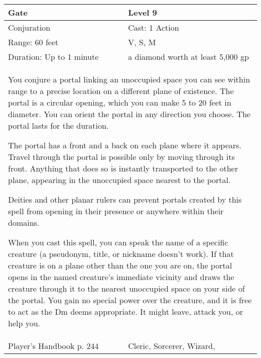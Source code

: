\documentclass[11pt]{report}
\begin{document}
\begin{table}[H]
	\begin{tabular}{||p{6cm}|p{6cm}||}
		\hline\hline
		\bf{Gate} & Level 9\\ \hline
		Conjuration & Cast: 1 Action\\ \hline
		Range: 60 feet & V, S, M\\ \hline
		Duration: Up to 1 minute & a diamond worth at least 5,000 gp\\ \hline
		\multicolumn{2}{||p{12cm}||}{You conjure a portal linking an unoccupied space you can see within range to a precise location on a different plane of existence. The portal is a circular opening, which you can make 5 to 20 feet in diameter. You can orient the portal in any direction you choose. The portal lasts for the duration.

The portal has a front and a back on each plane where it appears. Travel through the portal is possible only by moving through its front. Anything that does so is instantly transported to the other plane, appearing in the unoccupied space nearest to the portal.

Deities and other planar rulers can prevent portals created by this spell from opening in their presence or anywhere within their domains.

When you cast this spell, you can speak the name of a specific creature (a pseudonym, title, or nickname doesn’t work). If that creature is on a plane other than the one you are on, the portal opens in the named creature’s immediate vicinity and draws the creature through it to the nearest unoccupied space on your side of the portal. You gain no special power over the creature, and it is free to act as the Dm deems appropriate. It might leave, attack you, or help you.}\\ \hline
Player's Handbook p. 244 & Cleric, Sorcerer, Wizard, \\ \hline\hline
	\end{tabular}
\end{table}
\end{document}
